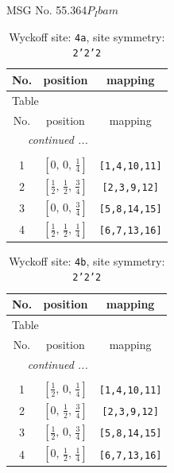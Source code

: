 \documentclass[fleqn,8pt]{jsarticle}
\begin{document}
\setcounter{MaxMatrixCols}{32}

\renewcommand{\tablename}{Table~}
\renewcommand{\figurename}{Figure~}
\begin{center}
\LARGE
MSG No. 55.364\quad$P_{I}bam$
\end{center}
\renewcommand{\arraystretch}{1.2}
\begin{longtable}{ccc}
\caption{Wyckoff site: {\tt 4a}, site symmetry: {\tt 2'2'2}}
 \\
 \hline \hline
No. & position & mapping \\ \hline \endfirsthead

\multicolumn{2}{l}{\tablename\ \thetable{}} \\
 \hline \hline
No. & position & mapping \\ \hline \endhead

 \hline \hline
\multicolumn{2}{r}{\footnotesize\it continued ...} \\ \endfoot

 \hline \hline
\multicolumn{2}{r}{} \\ \endlastfoot

1 & $\left[ 0,\, 0,\, \frac{1}{4} \right]$ & {\tt [1,4,10,11]} \\ \hline
2 & $\left[ \frac{1}{2},\, \frac{1}{2},\, \frac{3}{4} \right]$ & {\tt [2,3,9,12]} \\ \hline
3 & $\left[ 0,\, 0,\, \frac{3}{4} \right]$ & {\tt [5,8,14,15]} \\ \hline
4 & $\left[ \frac{1}{2},\, \frac{1}{2},\, \frac{1}{4} \right]$ & {\tt [6,7,13,16]} \\
\end{longtable}
\renewcommand{\arraystretch}{1.2}
\begin{longtable}{ccc}
\caption{Wyckoff site: {\tt 4b}, site symmetry: {\tt 2'2'2}}
 \\
 \hline \hline
No. & position & mapping \\ \hline \endfirsthead

\multicolumn{2}{l}{\tablename\ \thetable{}} \\
 \hline \hline
No. & position & mapping \\ \hline \endhead

 \hline \hline
\multicolumn{2}{r}{\footnotesize\it continued ...} \\ \endfoot

 \hline \hline
\multicolumn{2}{r}{} \\ \endlastfoot

1 & $\left[ \frac{1}{2},\, 0,\, \frac{1}{4} \right]$ & {\tt [1,4,10,11]} \\ \hline
2 & $\left[ 0,\, \frac{1}{2},\, \frac{3}{4} \right]$ & {\tt [2,3,9,12]} \\ \hline
3 & $\left[ \frac{1}{2},\, 0,\, \frac{3}{4} \right]$ & {\tt [5,8,14,15]} \\ \hline
4 & $\left[ 0,\, \frac{1}{2},\, \frac{1}{4} \right]$ & {\tt [6,7,13,16]} \\
\end{longtable}
\end{document}
